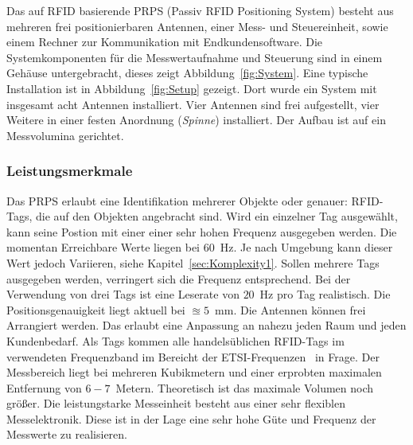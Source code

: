 Das auf RFID basierende PRPS (Passiv RFID Positioning System) besteht aus mehreren frei positionierbaren Antennen, einer Mess- und Steuereinheit, sowie einem Rechner zur Kommunikation mit Endkundensoftware. Die Systemkomponenten für die Messwertaufnahme und Steuerung sind in einem Gehäuse untergebracht, dieses zeigt Abbildung~\ref{fig:System}. Eine typische Installation ist in Abbildung~\ref{fig:Setup} gezeigt. Dort wurde ein System mit insgesamt acht Antennen installiert. Vier Antennen sind frei aufgestellt, vier Weitere in einer festen Anordnung (\textit{Spinne}) installiert. Der Aufbau ist auf ein Messvolumina gerichtet.\\
%
\subsubsection{Leistungsmerkmale}
%
Das PRPS erlaubt eine Identifikation mehrerer Objekte oder genauer: RFID-Tags, die auf den Objekten angebracht sind. Wird ein einzelner Tag ausgewählt, kann seine Postion mit einer einer sehr hohen Frequenz ausgegeben werden. Die momentan Erreichbare Werte liegen bei $60$~Hz. Je nach Umgebung kann dieser Wert jedoch Variieren, siehe Kapitel~\ref{sec:Komplexity1}. Sollen mehrere Tags ausgegeben werden, verringert sich die Frequenz entsprechend. Bei der Verwendung von drei Tags ist eine Leserate von $20$~Hz pro Tag realistisch. Die Positionsgenauigkeit liegt aktuell bei $\approxeq 5$~mm. Die Antennen können frei Arrangiert werden. Das erlaubt eine Anpassung an nahezu jeden Raum und jeden Kundenbedarf. Als Tags kommen alle handelsüblichen RFID-Tags im verwendeten Frequenzband im Bereicht der ETSI-Frequenzen~\cite{etsi1} in Frage. Der Messbereich liegt bei mehreren Kubikmetern und einer erprobten maximalen Entfernung von $6-7$~Metern. Theoretisch ist das maximale Volumen noch größer. Die leistungstarke Messeinheit besteht aus einer sehr flexiblen Messelektronik. Diese ist in der Lage eine sehr hohe Güte und Frequenz der Messwerte zu realisieren.\\


